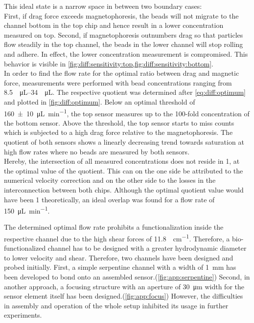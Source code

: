 This ideal state is a narrow space in between two boundary cases:\\
First, if drag force exceeds magnetophoresis, the beads will not migrate to the channel bottom in the top chip and hence result in a lower concentration measured on top. Second, if magnetophoresis outnumbers drag so that particles flow steadily in the top channel, the beads in the lower channel will stop rolling and adhere. In effect, the lower concentration measurement is compromised. This behavior is visible in \cref{fig:diff:sensitivity:top,fig:diff:sensitivity:bottom}.\\
In order to find the flow rate for the optimal ratio between drag and magnetic force, measurements were performed with bead concentrations ranging from \SIrange{8.5}{34}{\per\micro\liter}. The respective quotient was determined after \cref{eq:diff:optimum} and plotted in \cref{fig:diff:optimum}. Below an optimal threshold of \SI{160+-10}{\micro\liter\per\minute}, the top sensor measures up to the 100-fold concentration of the bottom sensor. Above the threshold, the top sensor starts to miss counts which is subjected to a high drag force relative to the magnetophoresis. The quotient of both sensors shows a linearly decreasing trend towards saturation at high flow rates where no beads are measured by both sensors.\\
Hereby, the intersection of all measured concentrations does not reside in \num{1}, at the optimal value of the quotient. This can on the one side be attributed to the numerical velocity correction and on the other side to the losses in the interconnection between both chips. Although the optimal quotient value would have been \num{1} theoretically, an ideal overlap was found for a flow rate of \SI{150}{\micro\liter\per\minute}.

The determined optimal flow rate prohibits a functionalization inside the respective channel due to the high shear forces of \SI{11.8}{\dyne\per\centi\meter}. Therefore, a bio-functionalized channel has to be designed with a greater hydrodynamic diameter to lower velocity and shear. Therefore, two channels have been designed and probed initially. First, a simple serpentine channel with a width of \SI{1}{\milli\meter} has been developed to bond onto an assembled sensor.(\cref{fig:app:serpentine}) Second, in another approach, a focusing structure with an aperture of \SI{30}{\micro\meter} width for the sensor element itself has been designed.(\cref{fig:app:focus}) However, the difficulties in assembly and operation of the whole setup inhibited its usage in further experiments.

